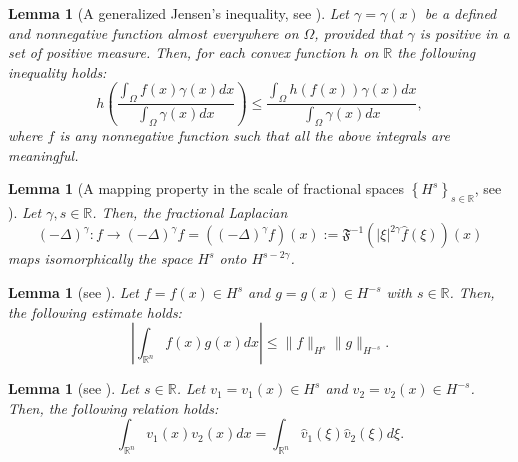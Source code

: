 \documentclass[11pt,reqno]{amsart}
\numberwithin{equation}{section}
\newtheorem{lemma}[theorem]{Lemma}
\theoremstyle{plain}
\begin{document}
\appendix
\begin{lemma}[A generalized Jensen's inequality, see \cite{Pavic2016}] \label{lem2}
Let $\gamma=\gamma(x)$ be a defined and nonnegative function almost everywhere on $\Omega$, provided that $\gamma$ is positive in a set of positive measure. Then, for each convex function $h$ on $\mathbb{R}$ the following inequality holds:
$$
h\left(\dfrac{\displaystyle\int_{\Omega} f(x) \gamma(x) d x}{\displaystyle\int_{\Omega} \gamma(x) d x}\right) \leq \dfrac{\displaystyle\int_{\Omega} h(f(x))\gamma(x) d x}{\displaystyle\int_{\Omega} \gamma(x) d x},
$$
where $f$ is any nonnegative function such that all the above integrals are meaningful.
\end{lemma}

\begin{lemma}[A mapping property in the scale of fractional spaces $\left\{H^s\right\}_{s \in \mathbb{R}}$, see \cite{Triebel1983}]\label{lem5}
Let $\gamma, s \in \mathbb{R}$. Then, the fractional Laplacian
$$
(-\Delta)^\gamma: f \rightarrow(-\Delta)^\gamma f=\left((-\Delta)^\gamma f\right)(x):=\mathfrak{F}^{-1}\left(|\xi|^{2 \gamma} \widehat{f}(\xi)\right)(x)
$$
maps isomorphically the space $H^s$ onto $H^{s-2 \gamma}$.
\end{lemma}

\begin{lemma}[see \cite{Egorov1997}] \label{lem6}
Let $f=f(x) \in H^s$ and $g=g(x) \in H^{-s}$ with $s \in \mathbb{R}$. Then, the following estimate holds:
$$
\left|\int_{\mathbb{R}^n} f(x) g(x) d x\right| \leq\|f\|_{H^s}\|g\|_{H^{-s}} .
$$
\end{lemma}

\begin{lemma}[see \cite{Anhblowup}] \label{lem7}
Let $s \in \mathbb{R}$. Let $v_1=v_1(x) \in H^s$ and $v_2=v_2(x) \in H^{-s}$. Then, the following relation holds:
$$
\int_{\mathbb{R}^n} v_1(x) v_2(x) d x=\int_{\mathbb{R}^n} \widehat{v}_1(\xi) \widehat{v}_2(\xi) d \xi .
$$
\end{lemma}


\end{document}
